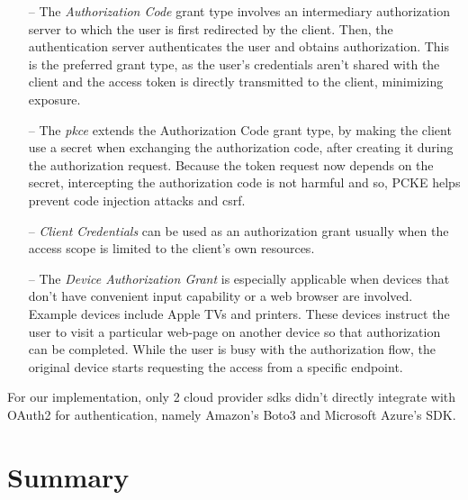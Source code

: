 \begin{itemize}
	\item [--]The \textit{Authorization Code} grant type involves an intermediary authorization server to which the user is first redirected by the client. Then, the authentication server authenticates the user and obtains authorization. This is the preferred grant type, as the user's credentials aren't shared with the client and the access token is directly transmitted to the client, minimizing exposure. 
	
	\item [--] The \textit{\ac{pkce}} extends the Authorization Code grant type, by making the client use a secret when exchanging the authorization code, after creating it during the authorization request. Because the token request now depends on the secret, intercepting the authorization code is not harmful and so, PCKE helps prevent code injection attacks and \ac{csrf}.
	
	\item [--] \textit{Client Credentials} can be used as an authorization grant usually when the access scope is limited to the client's own resources. 
	
	\item [--] The \textit{Device Authorization Grant} is especially applicable when devices that don't have convenient input capability or a web browser are involved. Example devices include Apple TVs and printers. These devices instruct the user to visit a particular web-page on another device so that authorization can be completed. While the user is busy with the authorization flow, the original device starts requesting the access from a specific endpoint.
\end{itemize}

For our implementation, only 2 cloud provider \ac{sdk}s didn't directly integrate with OAuth2 for authentication, namely Amazon's Boto3 and Microsoft Azure's SDK.

\section{Summary}
